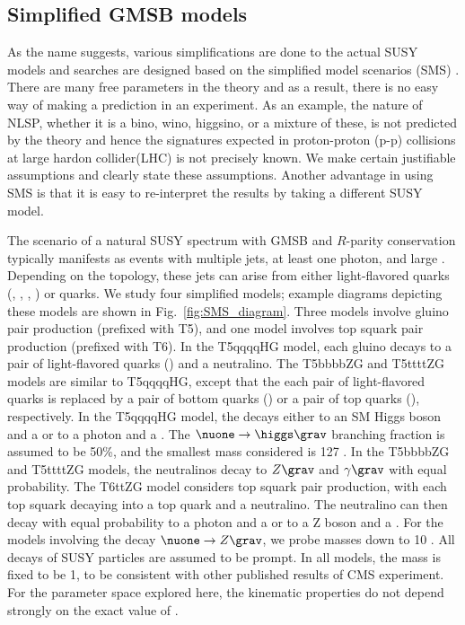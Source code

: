 \subsection{Simplified GMSB models}
As the name suggests, various simplifications are done to the actual SUSY models and searches are designed based on the simplified model scenarios (SMS) \cite{bib-sms-1,bib-sms-2,bib-sms-3,bib-sms-4,Chatrchyan:2013sza}. There are many free parameters in the theory and as a result, there is no easy way of making a prediction in an experiment. As an example, the nature of NLSP, whether it is a bino, wino, higgsino, or a mixture of these, is not predicted by the theory and hence the signatures expected in proton-proton (p-p) collisions at large hardon collider(LHC) is not precisely known. We make certain justifiable assumptions and clearly state these assumptions. Another advantage in using SMS is that it is easy to re-interpret the results by taking a different SUSY model.

The scenario of a natural SUSY spectrum with GMSB and $R$-parity conservation typically manifests as events with multiple jets, at least one photon, and large \ptmiss. Depending on the topology, these jets can arise from either light-flavored quarks (\cPqu, \cPqd, \cPqs, \cPqc) or {\cPqb} quarks. We study four simplified models; example diagrams depicting these models are shown in Fig.~\ref{fig:SMS_diagram}.
Three models involve gluino pair production (prefixed with T5), and one model involves top squark pair production (prefixed with T6).
In the T5qqqqHG model, each gluino decays to a pair of light-flavored quarks (\qqbar) and a neutralino.  The T5bbbbZG and T5ttttZG models are similar to T5qqqqHG, except that the each pair of light-flavored quarks is replaced by a pair of bottom quarks (\bbbar) or a pair of top quarks (\ttbar), respectively. In the T5qqqqHG model, the \nuone decays either to an SM Higgs boson and a \grav or to a photon and a \grav.  The $\nuone\to\higgs\grav$ branching fraction is assumed to be 50\%, and the smallest \nuone mass considered is 127 \gev. In the T5bbbbZG and T5ttttZG models, the neutralinos decay to $Z\grav$ and $\gamma\grav$ with equal probability. The T6ttZG model considers top squark pair production, with each top squark decaying into a top quark and a neutralino. The neutralino can then decay with equal probability to a photon and a \grav or to a Z boson and a \grav. For the models involving the decay $\nuone\to Z\grav$, we probe \nuone masses down to 10 \gev. All decays of SUSY particles are assumed to be prompt. In all models, the mass \grav is fixed to be 1\gev, to be consistent with other published results of CMS experiment. For the parameter space explored here, the kinematic properties do not depend strongly on the exact value of \grav.

